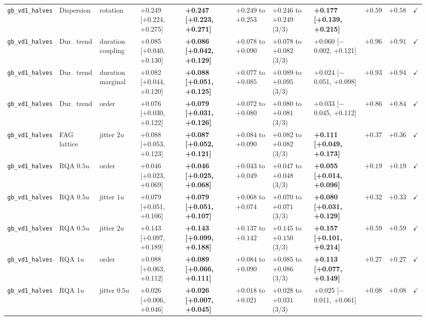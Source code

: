 \begin{longtable}{lllllllllrc}
\texttt{gb\_vd1\_halves} & Dispersion & rotation & +0.249 [+0.224, +0.275] & \textbf{+0.247 [+0.223, +0.271]} & $+0.249$ to $+0.253$ & $+0.246$ to $+0.249$ (3/3) & \textbf{+0.177 [+0.139, +0.215]} & $+0.59$ & $+0.58$ & $\checkmark$ \\
\texttt{gb\_vd1\_halves} & Dur.\ trend & duration coupling & +0.085 [+0.040, +0.130] & \textbf{+0.086 [+0.042, +0.129]} & $+0.078$ to $+0.090$ & $+0.078$ to $+0.082$ (3/3) & +0.060 [$-$0.002, +0.121] & $+0.96$ & $+0.91$ & $\checkmark$ \\
\texttt{gb\_vd1\_halves} & Dur.\ trend & duration marginal & +0.082 [+0.044, +0.120] & \textbf{+0.088 [+0.051, +0.125]} & $+0.077$ to $+0.085$ & $+0.089$ to $+0.095$ (3/3) & +0.024 [$-$0.051, +0.098] & $+0.93$ & $+0.94$ & $\checkmark$ \\
\texttt{gb\_vd1\_halves} & Dur.\ trend & order & +0.076 [+0.030, +0.122] & \textbf{+0.079 [+0.031, +0.126]} & $+0.072$ to $+0.080$ & $+0.080$ to $+0.081$ (3/3) & +0.033 [$-$0.045, +0.112] & $+0.86$ & $+0.84$ & $\checkmark$ \\
\texttt{gb\_vd1\_halves} & FAG lattice & jitter $2u$ & +0.088 [+0.053, +0.123] & \textbf{+0.087 [+0.052, +0.121]} & $+0.084$ to $+0.090$ & $+0.082$ to $+0.082$ (3/3) & \textbf{+0.111 [+0.049, +0.173]} & $+0.37$ & $+0.36$ & $\checkmark$ \\
\texttt{gb\_vd1\_halves} & RQA $0.5u$ & order & +0.046 [+0.023, +0.069] & \textbf{+0.046 [+0.025, +0.068]} & $+0.043$ to $+0.049$ & $+0.047$ to $+0.048$ (3/3) & \textbf{+0.055 [+0.014, +0.096]} & $+0.19$ & $+0.19$ & $\checkmark$ \\
\texttt{gb\_vd1\_halves} & RQA $0.5u$ & jitter $1u$ & +0.079 [+0.051, +0.106] & \textbf{+0.079 [+0.051, +0.107]} & $+0.068$ to $+0.074$ & $+0.070$ to $+0.071$ (3/3) & \textbf{+0.080 [+0.031, +0.129]} & $+0.32$ & $+0.33$ & $\checkmark$ \\
\texttt{gb\_vd1\_halves} & RQA $0.5u$ & jitter $2u$ & +0.143 [+0.097, +0.189] & \textbf{+0.143 [+0.099, +0.188]} & $+0.137$ to $+0.142$ & $+0.145$ to $+0.150$ (3/3) & \textbf{+0.157 [+0.101, +0.214]} & $+0.59$ & $+0.59$ & $\checkmark$ \\
\texttt{gb\_vd1\_halves} & RQA $1u$ & order & +0.088 [+0.063, +0.112] & \textbf{+0.089 [+0.066, +0.111]} & $+0.084$ to $+0.090$ & $+0.085$ to $+0.086$ (3/3) & \textbf{+0.113 [+0.077, +0.149]} & $+0.27$ & $+0.27$ & $\checkmark$ \\
\texttt{gb\_vd1\_halves} & RQA $1u$ & jitter $0.5u$ & +0.026 [+0.006, +0.046] & \textbf{+0.026 [+0.007, +0.045]} & $+0.018$ to $+0.021$ & $+0.028$ to $+0.031$ (3/3) & +0.025 [$-$0.011, +0.061] & $+0.08$ & $+0.08$ & $\checkmark$ \\

\end{longtable}
